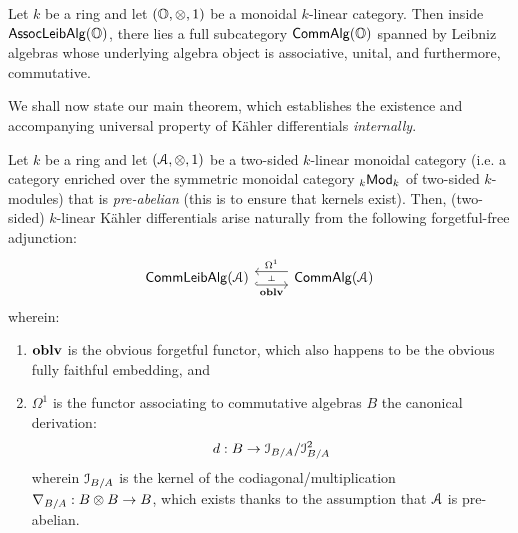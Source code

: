                 \begin{remark} \label{remark: commutative_leibniz_algebras}
                    Let $k$ be a ring and let $(\O, \tensor, 1)$ be a monoidal $k$-linear category. Then inside $\mathsf{Assoc}\mathsf{Leib}\mathsf{Alg}(\mathbb{O})$, there lies a full subcategory $\mathsf{Comm}\mathsf{Alg}(\mathbb{O})$ spanned by Leibniz algebras whose underlying algebra object is associative, unital, and furthermore, commutative.
                \end{remark}
                
                We shall now state our main theorem, which establishes the existence and accompanying universal property of K\"ahler differentials \textit{internally}.
                \begin{theorem} \label{theorem: kahler_differentials_universal_property}
                    Let $k$ be a ring and let $(\calA, \tensor, 1)$ be a two-sided $k$-linear monoidal category (i.e. a category enriched over the symmetric monoidal category ${}_k\mathsf{Mod}_k$ of two-sided $k$-modules) that is \textit{pre-abelian} (this is to ensure that kernels exist). Then, (two-sided) $k$-linear K\"ahler differentials arise naturally from the following forgetful-free adjunction:
                        $$
                            \begin{tikzcd}
                            	{\Comm\Leib\Alg(\calA)} & {\Comm\Alg(\calA)}
                            	\arrow[""{name=0, anchor=center, inner sep=0}, "\oblv"', shift right=2, hook, from=1-1, to=1-2]
                            	\arrow[""{name=1, anchor=center, inner sep=0}, "{\Omega^1}"', shift right=2, from=1-2, to=1-1]
                            	\arrow["\dashv"{anchor=center, rotate=-90}, draw=none, from=1, to=0]
                            \end{tikzcd}
                        $$
                    wherein:
                        \begin{enumerate}
                            \item $\mathbf{oblv}$ is the obvious forgetful functor, which also happens to be the obvious fully faithful embedding, and
                            \item $\Omega^1$ is the functor associating to commutative algebras $B$ the canonical derivation:
                                $$d: B \to \mathcal{I}_{B/A}/\mathcal{I}_{B/A}^2$$
                            wherein $\mathcal{I}_{B/A}$ is the kernel of the codiagonal/multiplication $\nabla_{B/A}: B \tensor B \to B$, which exists thanks to the assumption that $\mathcal{A}$ is pre-abelian.
                        \end{enumerate}
                \end{theorem}
